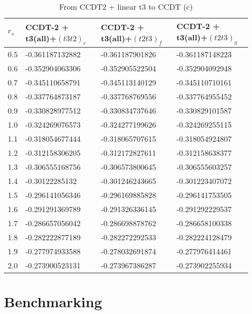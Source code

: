 \begin{table}[hbtp]
\caption{From CCDT2 + linear t3 to CCDT (c)}
\begin{center}
\begin{threeparttable}
\begin{tabular}{l l l l}
    \toprule
$r_s$ & CCDT-2 + t3(all)+$(t3t2)_e$ & CCDT-2 + t3(all)+$(t2t3)_f$ & CCDT-2 + t3(all)+$(t2t3)_g$  \\ \hline
0.5 & -0.361187132882 & -0.361187901826 & -0.361187148223   \\
0.6 & -0.352904063306 & -0.352905522504 & -0.352904092948   \\
0.7 & -0.345110658791 & -0.345113140129 & -0.345110710161   \\
0.8 & -0.337764873187 & -0.337768769556 & -0.337764955452   \\
0.9 & -0.330828977512 & -0.330834737646 & -0.330829101587   \\
1.0 & -0.324269076573 & -0.324277199626 & -0.324269255115   \\
1.1 & -0.318054677444 & -0.318065707615 & -0.318054924807   \\
1.2 & -0.312158306205 & -0.312172827611 & -0.312158638377   \\
1.3 & -0.306555168756 & -0.306573800645 & -0.306555603257   \\
1.4 & -0.30122285132 & -0.301246243665 & -0.301223407072   \\
1.5 & -0.296141056346 & -0.296169885828 & -0.296141753505   \\
1.6 & -0.291291369789 & -0.291326336145 & -0.291292229537   \\
1.7 & -0.286657056042 & -0.286698878762 & -0.286658100338   \\
1.8 & -0.282222877189 & -0.282272292533 & -0.282224128479   \\
1.9 & -0.277974933588 & -0.278032691874 & -0.277976414461   \\
2.0 & -0.273900523131 & -0.273967386287 & -0.273902255934   \\
\bottomrule
\end{tabular}
\begin{tablenotes}
\end{tablenotes}
\end{threeparttable}
\end{center}
\label{tab:ccdt3_to_ccdt_3}
\end{table}

\FloatBarrier

\section{Benchmarking}

